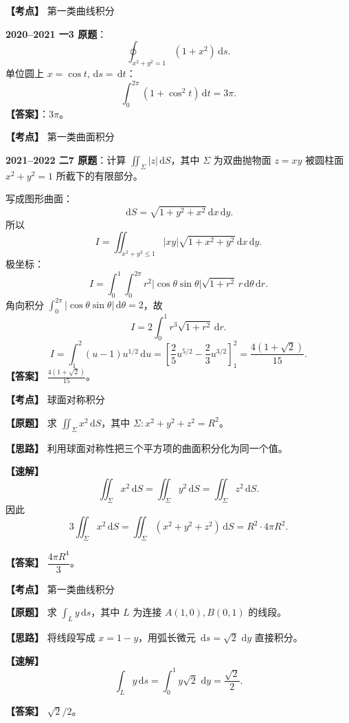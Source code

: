 ﻿\documentclass[11pt,a4paper,UTF8]{ctexart}
\newcommand{\dd}{\,\mathrm d}
\begin{document}
\begin{answerbox}[2020--2021 一-3]
\textbf{【考点】} 第一类曲线积分

\textbf{2020--2021 一3 原题}：
\[
\oint_{x^2+y^2=1}(1+x^2)\dd s.
\]
单位圆上 $x=\cos t,\dd s=\dd t$：
\[
\int_0^{2\pi}(1+\cos^2t)\dd t=3\pi.
\]
\textbf{【答案】}：$3\pi$。

\end{answerbox}

\begin{answerbox}[2021--2022 二-7]
\textbf{【考点】} 第一类曲面积分

\textbf{2021--2022 二7 原题}：计算 $\iint_\Sigma |z|\dd S$，其中 $\Sigma$ 为双曲抛物面 $z=xy$ 被圆柱面 $x^2+y^2=1$ 所截下的有限部分。

写成图形曲面：
\[
\dd S=\sqrt{1+y^2+x^2}\dd x\dd y.
\]
所以
\[
I=\iint_{x^2+y^2\le1}|xy|\sqrt{1+x^2+y^2}\dd x\dd y.
\]
极坐标：
\[
I=\int_0^1\int_0^{2\pi}r^2|\cos\theta\sin\theta|\sqrt{1+r^2}\,r\dd\theta\dd r.
\]
角向积分 $\int_0^{2\pi}|\cos\theta\sin\theta|\dd\theta=2$，故
\[
I=2\int_0^1r^3\sqrt{1+r^2}\dd r.
\]
\[
I=\int_1^2(u-1)u^{1/2}\dd u
=\left[\frac25u^{5/2}-\frac23u^{3/2}\right]_1^2
=\frac{4(1+\sqrt2)}{15}.
\]
\textbf{【答案】} $\displaystyle \frac{4(1+\sqrt2)}{15}$。

\end{answerbox}

\newpage

\begin{answerbox}[2024--2025 一-5]
\textbf{【考点】} 球面对称积分

\textbf{【原题】} 求 $\displaystyle \iint_{\Sigma}x^2\dd S$，其中 $\Sigma:x^2+y^2+z^2=R^2$。

\textbf{【思路】} 利用球面对称性把三个平方项的曲面积分化为同一个值。

\textbf{【速解】}
\[
\iint_\Sigma x^2\dd S=\iint_\Sigma y^2\dd S=\iint_\Sigma z^2\dd S.
\]
因此
\[
3\iint_\Sigma x^2\dd S
=\iint_\Sigma (x^2+y^2+z^2)\dd S
=R^2\cdot 4\pi R^2.
\]

\textbf{【答案】} $\dfrac{4\pi R^4}{3}$。
\end{answerbox}

\begin{answerbox}[2024--2025 一-4]
\textbf{【考点】} 第一类曲线积分

\textbf{【原题】} 求 $\displaystyle \int_L y\dd s$，其中 $L$ 为连接 $A(1,0),B(0,1)$ 的线段。

\textbf{【思路】} 将线段写成 $x=1-y$，用弧长微元 $\dd s=\sqrt2\,\dd y$ 直接积分。

\textbf{【速解】}
\[
\int_Ly\dd s=\int_0^1y\sqrt2\,\dd y=\frac{\sqrt2}{2}.
\]

\textbf{【答案】} $\sqrt2/2$。
\end{answerbox}
\end{document}
